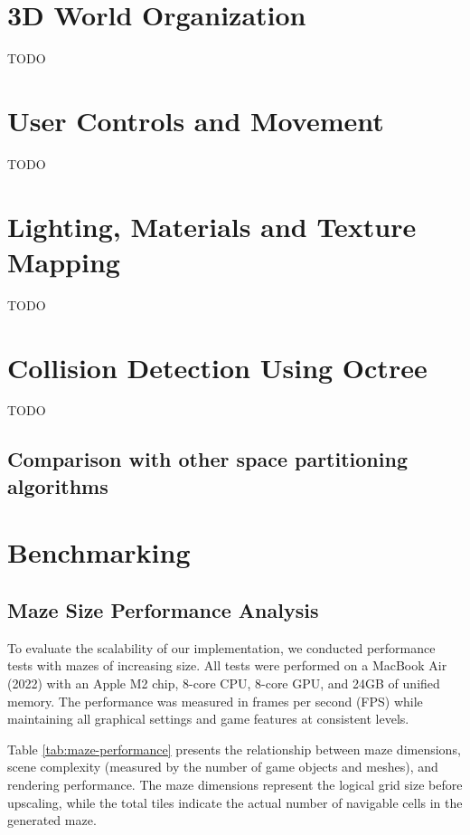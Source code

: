 \documentclass{article}
\begin{document}
\section{3D World Organization}
TODO

\section{User Controls and Movement}
TODO

\section{Lighting, Materials and Texture Mapping}
TODO

\section{Collision Detection Using Octree}
TODO

\subsection{Comparison with other space partitioning algorithms}

\section{Benchmarking}

\subsection{Maze Size Performance Analysis}
To evaluate the scalability of our implementation, we conducted performance tests with mazes of increasing size. All tests were performed on a MacBook Air (2022) with an Apple M2 chip, 8-core CPU, 8-core GPU, and 24GB of unified memory. The performance was measured in frames per second (FPS) while maintaining all graphical settings and game features at consistent levels.

Table \ref{tab:maze-performance} presents the relationship between maze dimensions, scene complexity (measured by the number of game objects and meshes), and rendering performance. The maze dimensions represent the logical grid size before upscaling, while the total tiles indicate the actual number of navigable cells in the generated maze.
\end{document}
